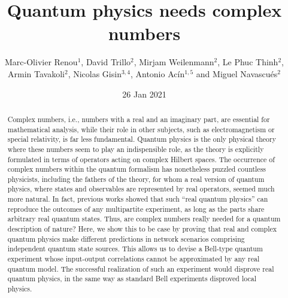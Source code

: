 \documentclass[onecolumn,prx,amsmath,amssymb,12pt]{revtex4-2}
\begin{document}
\title{\large Quantum physics needs complex numbers}
\author{\normalsize Marc-Olivier Renou$^1$, David Trillo$^2$, Mirjam Weilenmann$^2$, Le Phuc Thinh$^2$, Armin Tavakoli$^2$, Nicolas Gisin$^{3,4}$, Antonio Ac\'in$^{1,5}$ and Miguel Navascu\'es$^2$}



\begin{abstract}
Complex numbers, i.e., numbers with a real and an imaginary part, are essential for mathematical analysis, while their role in other subjects, such as electromagnetism or special relativity, is far less fundamental. Quantum physics is the only physical theory where these numbers seem to play an indispensible role, as the theory is explicitly formulated in terms of operators acting on complex Hilbert spaces. The occurrence of complex numbers within the quantum formalism has nonetheless puzzled countless physicists, including the fathers of the theory, for whom a real version of quantum physics, where states and observables are represented by real operators, seemed much more natural. In fact, previous works showed that such ``real quantum physics'' can reproduce the outcomes of any multipartite experiment, as long as the parts share arbitrary real quantum states. Thus, are complex numbers really needed for a quantum description of nature? Here, we show this to be case by proving that real and complex quantum physics make different predictions in network scenarios comprising independent quantum state sources. This allows us to devise a Bell-type quantum experiment whose input-output correlations cannot be approximated by any real quantum model. The successful realization of such an experiment would disprove real quantum physics, in the same way as standard Bell experiments disproved local  physics.
\end{abstract}
\date{26 Jan 2021}

\maketitle
\newpage
\end{document}
